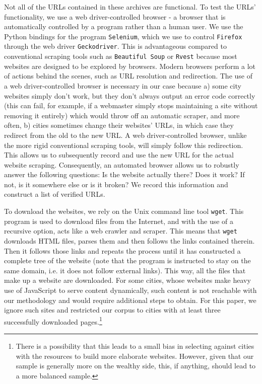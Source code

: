 \documentclass[11pt]{article}
\begin{document}
Not all of the URLs contained in these archives are functional. To test the URLs' functionality, we use a web driver-controlled browser - a browser that is automatically controlled by a program rather than a human user. We use the Python bindings for the program \texttt{Selenium}, which we use to control \texttt{Firefox} through the web driver  \texttt{Geckodriver}. This is advantageous compared to conventional scraping tools such as \texttt{Beautiful Soup} or \texttt{Rvest} because most websites are designed to be explored by browsers. Modern browsers perform a lot of actions behind the scenes, such as URL resolution and redirection. The use of a web driver-controlled browser is necessary in our case because a) some city websites simply don't work, but they don't always output an error code correctly (this can fail, for example, if a webmaster simply stops maintaining a site without removing it entirely) which would throw off an automatic scraper, and more often, b) cities sometimes change their websites' URLs, in which case they redirect from the old to the new URL. A web driver-controlled browser, unlike the more rigid conventional scraping tools, will simply follow this redirection. This allows us to subsequently record and use the new URL for the actual website scraping. Consequently, an automated browser allows us to robustly answer the following questions: Is the website actually there? Does it work? If not, is it somewhere else or is it broken? We record this information and construct a list of verified URLs.

To download the websites, we rely on the Unix command line tool \texttt{wget}. This program is used to download files from the Internet, and with the use of a recursive option, acts like a web crawler and scraper. This means that \texttt{wget} downloads HTML files, parses them and then follows the links contained therein. Then it follows those links and repeats the process until it has constructed a complete tree of the website (note that the program is instructed to stay on the same domain, i.e. it does not follow external links). This way, all the files that make up a website are downloaded. For some cities, whose websites make heavy use of JavaScript to serve content dynamically, such content is not reachable with our methodology and would require additional steps to obtain. For this paper, we ignore such sites and restricted our corpus to cities with at least three successfully downloaded pages.\footnote{There is a possibility that this leads to a small bias in selecting against cities with the resources to build more elaborate websites. However, given that our sample is generally more on the wealthy side, this, if anything, should lead to a more balanced sample.}
\end{document}
